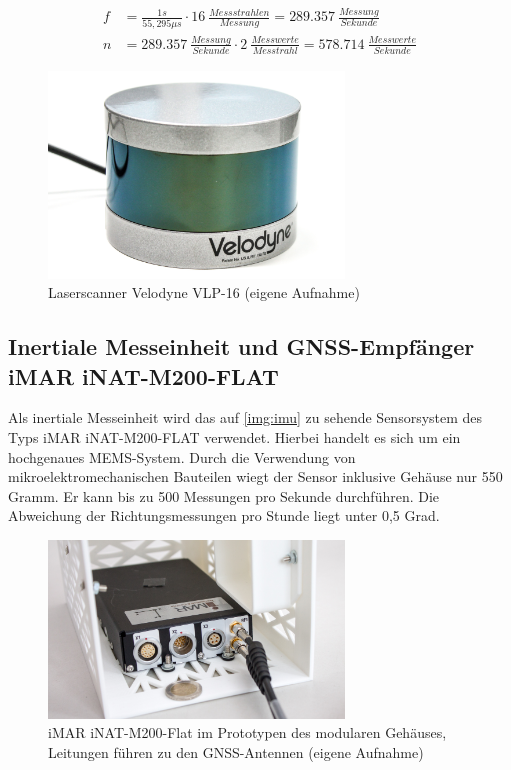 \documentclass[a4paper,12pt,bibliography=totoc, listof=totoc,titlepage,pointlessnumbers]{scrreprt}
\begin{document}
\begin{equation}
 \label{equ:XproS}
 \begin{aligned}
  f &= \frac{1s}{55,295\mu s} \cdot 16~\frac{Messstrahlen}{Messung} = 289.357~\frac{Messung}{Sekunde} \\
  n &= 289.357~\frac{Messung}{Sekunde} \cdot 2~\frac{Messwerte}{Messtrahl} = 578.714~\frac{Messwerte}{Sekunde}
 \end{aligned}
\end{equation}

\begin{figure}[ht!]
 \centering
 \includegraphics[width=0.7\textwidth]{./img/vlp16.jpg}
 \caption{Laserscanner Velodyne VLP-16 (eigene Aufnahme)}
 \label{img:vlp16}
\end{figure}

\subsection{Inertiale Messeinheit und GNSS-Empfänger iMAR iNAT-M200-FLAT}
\label{s:iMar}
Als inertiale Messeinheit wird das auf \autoref{img:imu} zu sehende Sensorsystem des Typs iMAR iNAT-M200-FLAT verwendet. Hierbei handelt es sich um ein hochgenaues MEMS-System. Durch die Verwendung von mikroelektromechanischen Bauteilen wiegt der Sensor inklusive Gehäuse nur 550 Gramm. Er kann bis zu 500 Messungen pro Sekunde durchführen. Die Abweichung der Richtungsmessungen pro Stunde liegt unter 0,5 Grad. \citep{imar}

\begin{figure}[ht!]
 \centering
 \includegraphics[width=0.7\textwidth]{./img/imu.jpg}
 \caption{iMAR iNAT-M200-Flat im Prototypen des modularen Gehäuses, Leitungen führen zu den GNSS-Antennen (eigene Aufnahme)}
 \label{img:imu}
\end{figure}
\end{document}
